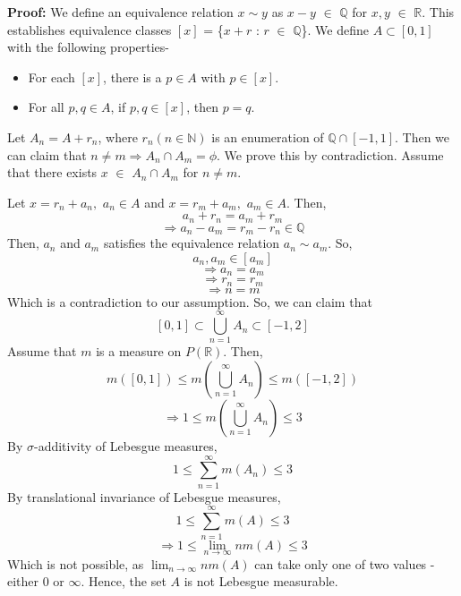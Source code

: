 \documentclass{article}
\begin{document}
\textbf{Proof: }We define an equivalence relation $x \sim y$ as $x - y$ $\in$ $\mathbb{Q}$ for $x, y$  $\in$ $\mathbb{R}$. This establishes equivalence classes $[x]$ = \{$x + r$ : $r$ $\in$ $\mathbb{Q}$\}. We define $A \subset [0, 1]$ with the following properties-

\begin{itemize}
	\item For each $[x]$, there is a $p \in A$ with $p \in [x]$.
	\item For all $p, q \in A$, if $p, q \in [x]$, then $p = q$.
\end{itemize}

Let $A_n = A + r_n$, where $r_n (n \in \mathbb{N})$ is an enumeration of $\mathbb{Q} \cap [-1,1]$. Then we can claim that $n \neq m \Rightarrow A_n \cap A_m = \phi$. We prove this by contradiction. Assume that there exists $x$ $\in$ $A_n \cap A_m$ for $n \neq m$.

Let $x = r_n + a_n,$ $a_n \in A$ and $x= r_m + a_m,$ $a_m \in A$. Then,
$$a_n + r_n = a_m + r_m$$
$$\Rightarrow a_n - a_m = r_m - r_n \in \mathbb{Q}$$
Then, $a_n$ and $a_m$ satisfies the equivalence relation $a_n \sim a_m$. So,
$$a_n, a_m \in [a_m]$$
$$\Rightarrow a_n = a_m$$
$$\Rightarrow r_n = r_m$$
$$\Rightarrow n = m$$
Which is a contradiction to our assumption. So, we can claim that 
$$[0, 1] \subset \bigcup\limits_{n=1}^\infty A_n \subset [-1, 2]$$
Assume that $m$ is a measure on $P(\mathbb{R})$. Then,
$$m([0, 1]) \leq m(\bigcup\limits_{n=1}^\infty A_n) \leq m([-1, 2])$$
$$\Rightarrow 1 \leq m(\bigcup\limits_{n=1}^\infty A_n) \leq 3 $$
By $\sigma$-additivity of Lebesgue measures,
$$1 \leq \sum\limits_{n=1}^\infty m(A_n) \leq 3$$
By translational invariance of Lebesgue measures,
$$1 \leq \sum\limits_{n=1}^\infty m(A) \leq 3 $$
$$\Rightarrow 1 \leq \lim_{n \rightarrow \infty} n m(A) \leq 3 $$
Which is not possible, as $\lim_{n \rightarrow \infty} n m(A)$ can take only one of two values - either 0 or $\infty$. Hence, the set $A$ is not Lebesgue measurable.
\end{document}
